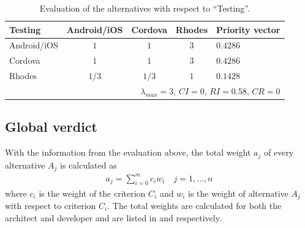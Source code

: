 \begin{table}[h!]
    \begin{center}
        \begin{tabular}{lcccl}
            \hline
            \textbf{Testing} & Android/iOS & Cordova & Rhodes & Priority vector \\
            \hline
            Android/iOS      & $1$         & $1$     & $3$    & $0.4286$ \\
            Cordova          & $1$         & $1$     & $3$    & $0.4286$ \\
            Rhodes           & $1/3$       & $1/3$   & $1$    & $0.1428$ \\
            \hline
            \multicolumn{5}{r}{$\lambda_{max} = 3$, $CI = 0$, $RI = 0.58$, $CR = 0$}\\
            \hline
        \end{tabular}
        \caption{Evaluation of the alternatives with respect to ``Testing''.}
        \label{tab:testing}
    \end{center}
\end{table}

\subsection*{Global verdict}

With the information from the evaluation above, the total weight $a_j$ of every alternative $A_j$ is calculated as
\begin{gather}
    a_j = \sum_{i = 0}^{m} c_i w_i \quad j = 1, \ldots, n
\end{gather}
where $c_i$ is the weight of the criterion $C_i$ and $w_i$ is the weight of alternative $A_j$ with respect to criterion $C_i$. The total weights are calculated for both the architect and developer and are listed in  and  respectively. 

